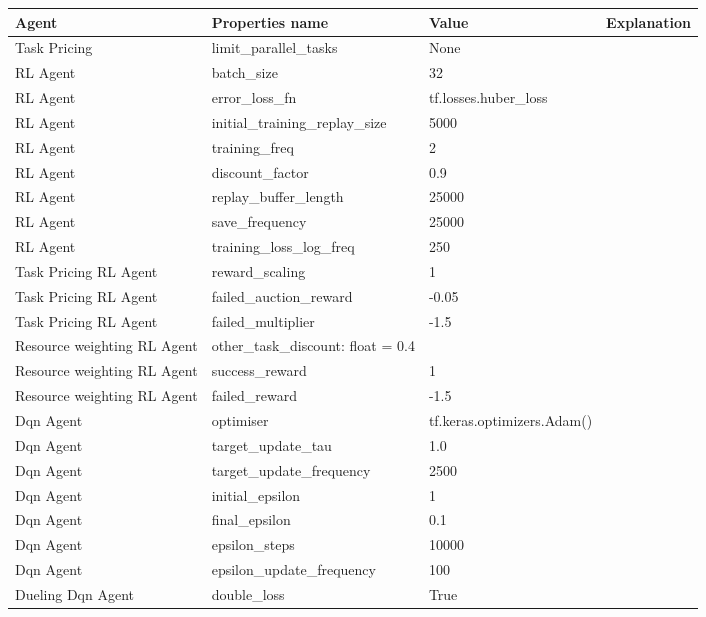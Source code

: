 \begin{longtable}{|p{3.5cm}|p{11cm}|} \hline
    \textbf{Agent} & \textbf{Properties name} & \textbf{Value} & \textbf{Explanation} \\ \hline
        Task Pricing & limit_parallel_tasks & None & \\ \hline
        RL Agent & batch_size &  32 & \\ \hline
        RL Agent & error_loss_fn & tf.losses.huber_loss & \\ \hline
        RL Agent & initial_training_replay_size & 5000 & \\ \hline
        RL Agent & training_freq & 2 & \\ \hline
        RL Agent & discount_factor & 0.9 & \\ \hline
        RL Agent & replay_buffer_length & 25000 & \\ \hline
        RL Agent & save_frequency & 25000 & \\ \hline
        RL Agent & training_loss_log_freq & 250 & \\ \hline \hline
        Task Pricing RL Agent & reward_scaling & 1 & \\ \hline
        Task Pricing RL Agent & failed_auction_reward & -0.05 & \\ \hline
        Task Pricing RL Agent & failed_multiplier & -1.5 & \\ \hline \hline
        Resource weighting RL Agent & other_task_discount: float = 0.4 & \\ \hline
        Resource weighting RL Agent & success_reward & 1 & \\ \hline
        Resource weighting RL Agent & failed_reward & -1.5 & \\ \hline \hline
        Dqn Agent & optimiser & tf.keras.optimizers.Adam() & \\ \hline
        Dqn Agent & target_update_tau & 1.0 & \\ \hline
        Dqn Agent & target_update_frequency & 2500 & \\ \hline
        Dqn Agent & initial_epsilon & 1 & \\ \hline
        Dqn Agent & final_epsilon & 0.1 & \\ \hline
        Dqn Agent & epsilon_steps & 10000 & \\ \hline
        Dqn Agent & epsilon_update_frequency & 100 & \\ \hline \hline
        Dueling Dqn Agent & double_loss & True & \\ \hline \hline

\end{longtable}
